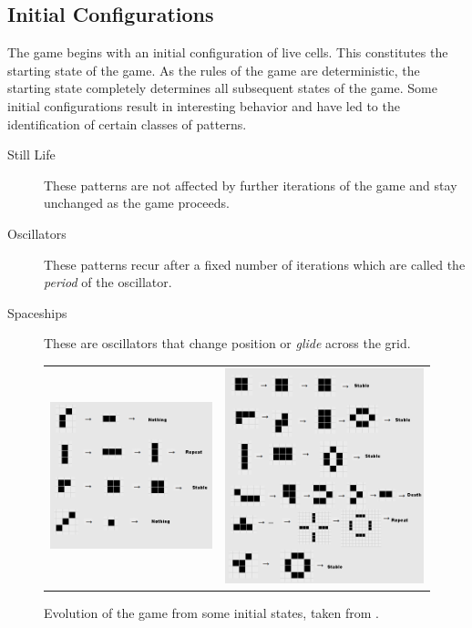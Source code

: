 \documentclass[addpoints]{exam}
\begin{document}
\subsection{Initial Configurations}

The game begins with an initial configuration of live cells. This constitutes the starting state of the game. As the rules of the game are deterministic, the starting state completely determines all subsequent states of the game. Some initial configurations result in interesting behavior and have led to the identification of certain classes of patterns.
\begin{description}
\item[Still Life] These patterns are not affected by further iterations of the game and stay unchanged as the game proceeds.
\item[Oscillators] These patterns recur after a fixed number of iterations which are called the \textit{period} of the oscillator.
\item[Spaceships] These are oscillators that change position or \textit{glide} across the grid.
\end{description}

\begin{figure}[!h]
  \centering
  \begin{tabular}{cc}
    \includegraphics[width=.48\textwidth]{pattern1}
    & \includegraphics[width=.48\textwidth]{pattern2}
  \end{tabular}
  \caption{Evolution of the game from some initial states, taken from \cite{chaos}.}
\end{figure}
\end{document}
